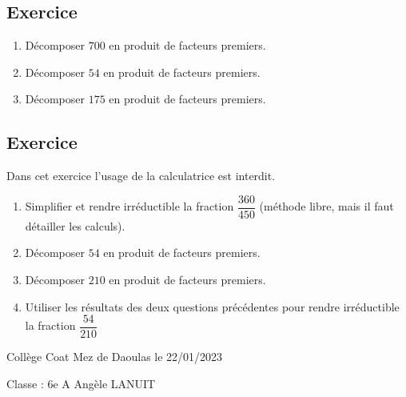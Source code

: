 \documentclass[a4paper,12pt,fleqn]{article}
\newcounter{exo}          				%
\newcommand{\exo}{					%
  	\stepcounter{exo}        			%
  	\subsection*{Exercice \no{}\theexo}}
\newcommand{\titreitem}[1]{
\Ovalbox{\makebox[.99\linewidth][l]{{Compétence : {#1} }}}
\vspace{0.3cm}} %
\begin{document}
\vspace{0.5cm}

\medskip
\begin{minipage}{0.99\linewidth}

\exo

\begin{enumerate}

\item Décomposer $700$ en produit de facteurs premiers.
\item Décomposer $54$ en produit de facteurs premiers.
\item Décomposer $175$ en produit de facteurs premiers.

\end{enumerate}
\end{minipage}

\vspace{0.5cm}

\medskip
\begin{minipage}{0.99\linewidth}

\exo

Dans cet exercice l'usage de la calculatrice est interdit.

\begin{enumerate}

\item Simplifier et rendre irréductible la fraction $\dfrac{360}{450}$ (méthode libre, mais il faut détailler les calculs).
\item Décomposer $54$ en produit de facteurs premiers.
\item Décomposer $210$ en produit de facteurs premiers.
\item Utiliser les résultats des deux questions précédentes pour rendre irréductible la fraction $\dfrac{54}{210}$
\end{enumerate}
\end{minipage}

\vspace{0.5cm}

\medskip
\newpage
\setcounter{exo}{0}


Collège Coat Mez de Daoulas  \hfill  le 22/01/2023

Classe : 6e A \hfill Angèle LANUIT
\end{document}
